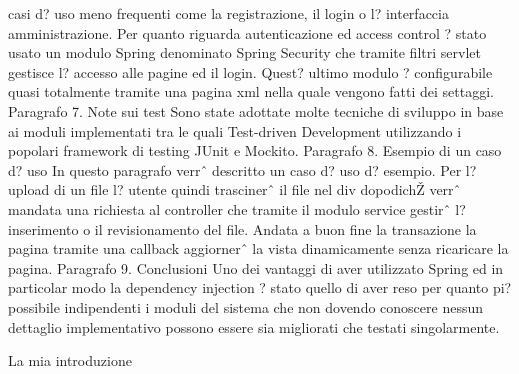casi d? uso meno frequenti come la registrazione, il login o l?
interfaccia amministrazione. Per quanto riguarda autenticazione ed
access control ? stato usato un modulo Spring denominato Spring
Security che tramite filtri servlet gestisce l? accesso alle pagine ed
il login. Quest? ultimo modulo ? configurabile quasi totalmente
tramite una pagina xml nella quale vengono fatti dei
settaggi. Paragrafo 7. Note sui test Sono state adottate molte
tecniche di sviluppo in base ai moduli implementati tra le quali
Test-driven Development utilizzando i popolari framework di testing
JUnit e Mockito. Paragrafo 8. Esempio di un caso d? uso In questo
paragrafo verrˆ descritto un caso d? uso d? esempio. Per l? upload di
un file l? utente quindi trascinerˆ il file nel div dopodichŽ verrˆ
mandata una richiesta al controller che tramite il modulo service
gestirˆ l? inserimento o il revisionamento del file. Andata a buon
fine la transazione la pagina tramite una callback aggiornerˆ la vista
dinamicamente senza ricaricare la pagina. Paragrafo 9. Conclusioni Uno
dei vantaggi di aver utilizzato Spring ed in particolar modo la
dependency injection ? stato quello di aver reso per quanto pi?
possibile indipendenti i moduli del sistema che non dovendo conoscere
nessun dettaglio implementativo possono essere sia migliorati che
testati singolarmente.

La mia introduzione

